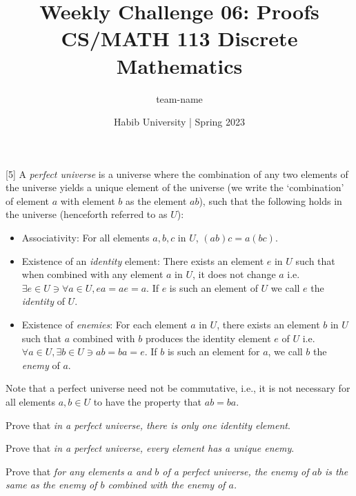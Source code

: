 \documentclass[a4paper]{exam}
\title{Weekly Challenge 06: Proofs\\CS/MATH 113 Discrete Mathematics}
\author{team-name}  %
\date{Habib University | Spring 2023}
\begin{document}
\maketitle

\begin{questions}

  [5] A \textit{perfect universe} is a universe where the combination of any two elements of the universe yields a unique element of the universe (we write the `combination' of element $a$ with element $b$ as the element $ab$), such that the following holds in the universe (henceforth referred to as $U$): 
  \begin{itemize}
  \item Associativity: For all elements $a, b, c$ in $U$, $(ab)c = a(bc)$. 
  \item Existence of an \textit{identity} element: There exists an element $e$ in $U$ such that when combined with any element $a$ in $U$, it does not change $a$ i.e. $\exists e \in U \ni \forall a \in U, ea=ae=a$. If $e$ is such an element of $U$ we call $e$ the \textit{identity} of $U$.
  \item Existence of \textit{enemies}: For each element $a$ in $U$, there exists an element $b$ in $U$ such that $a$ combined with $b$ produces the identity element $e$ of $U$ i.e. $\forall a \in U, \exists b \in U \ni ab= ba = e$. If $b$ is such an element for $a$, we call $b$ the \textit{enemy} of $a$.
  \end{itemize}
  Note that a perfect universe need not be commutative, i.e., it is not necessary for all elements $a, b\in U$ to have the property that $ab=ba$.\\
  
  \begin{parts}
  \item Prove that \textit{in a perfect universe, there is only one identity element}.
    \begin{solution}
    \end{solution}
  \item Prove that \textit{in a perfect universe, every element has a unique enemy}.
    \begin{solution}
    \end{solution}
  \item Prove that \textit{for any elements $a$ and $b$ of a perfect universe, the enemy of $ab$ is the same as the enemy of $b$ combined with the enemy of $a$.}
    \begin{solution}
    \end{solution}
  \end{parts}

\end{questions}
\end{document}
